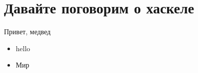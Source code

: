 \documentclass[10pt, a4paper]{article}
\begin{document}
\section{Давайте поговорим о хаскеле}

Привет, медвед


\begin{itemize}
	\item hello
	\item Мир
\end{itemize}
\end{document}
